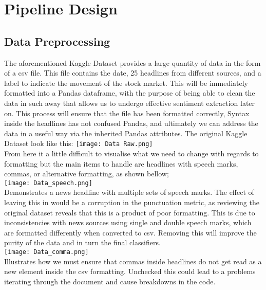 \documentclass[11pt, a4paper]{article}
\begin{document}
\section{Pipeline Design}
\subsection{Data Preprocessing}
The aforementioned Kaggle Dataset provides a large quantity of data in the form of a csv file. This file contains the date, 25 headlines from different sources, and a label to indicate the movement of the stock market. This will be immediately formatted into a Pandas dataframe, with the purpose of being able to clean the data in such away that allows us to undergo effective sentiment extraction later on. This process will ensure that the file has been formatted correctly, Syntax inside the headlines has not confused Pandas, and ultimately we can address the data in a useful way via the inherited Pandas attributes.
The original Kaggle Dataset look like this:
\texttt{[image: Data Raw.png]} 
\\
From here it a little difficult to visualise what we need to change with regards to formatting but the main items to handle are headlines with speech marks, commas, or alternative formatting, as shown bellow;\\

\texttt{[image: Data\_speech.png]}\\
Demonstrates a news headline with multiple sets of speech marks. The effect of leaving this in would be a corruption in the punctuation metric, as reviewing the original dataset reveals that this is a product of poor formatting. This is due to inconsistencies with news sources using single and double speech marks, which are formatted differently when converted to csv. Removing this will improve the purity of the data and in turn the final classifiers.\\

\texttt{[image: Data\_comma.png]}\\
Illustrates how we must ensure that commas inside headlines do not get read as a new element inside the  csv formatting. Unchecked this could lead to a problems
iterating through the document and cause breakdowns in the code.
 
\end{document}
